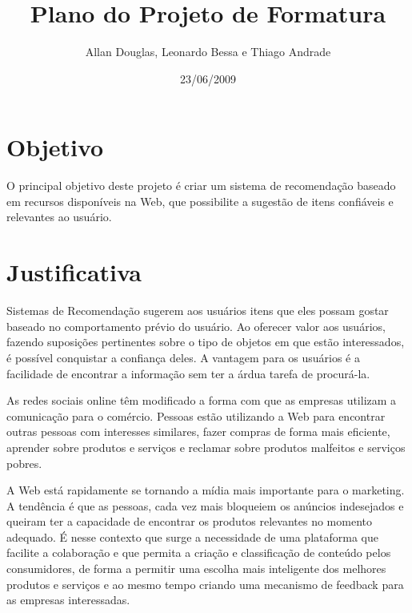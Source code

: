 \documentclass[]{article}
\title{Plano do Projeto de Formatura}
\author{Allan Douglas, Leonardo Bessa e Thiago Andrade  }
\date{23/06/2009}
\begin{document}
\ifpdf
{}
\else
{}
\fi

\maketitle


\section{Objetivo} %
\label{sec:objetivo}

O principal objetivo deste projeto é criar um sistema de recomendação baseado em recursos disponíveis na Web, que possibilite a sugestão de itens confiáveis e relevantes ao usuário.


\section{Justificativa} %
\label{sec:objetivos_e_justificativas}

Sistemas de Recomendação sugerem aos usuários itens que eles possam gostar baseado no comportamento prévio do usuário. Ao oferecer valor aos usuários, fazendo suposições pertinentes sobre o tipo de objetos em que estão interessados, é possível conquistar a confiança deles. A vantagem para os usuários é a facilidade de encontrar a informação sem ter a árdua tarefa de procurá-la.

As redes sociais online têm modificado a forma com que as empresas utilizam a comunicação para o comércio. Pessoas estão utilizando a Web para encontrar outras pessoas com interesses similares, fazer compras de forma mais eficiente, aprender sobre produtos e serviços e reclamar sobre produtos malfeitos e serviços pobres.

A Web está rapidamente se tornando a mídia mais importante para o marketing. A tendência é que as pessoas, cada vez mais bloqueiem os anúncios indesejados e queiram ter a capacidade de encontrar os produtos relevantes no momento adequado. É nesse contexto que surge a necessidade de uma plataforma que facilite a colaboração e que permita a criação e classificação de conteúdo pelos consumidores, de forma a permitir uma escolha mais inteligente dos melhores produtos e serviços e ao mesmo tempo criando uma mecanismo de feedback para as empresas interessadas.
\end{document}
